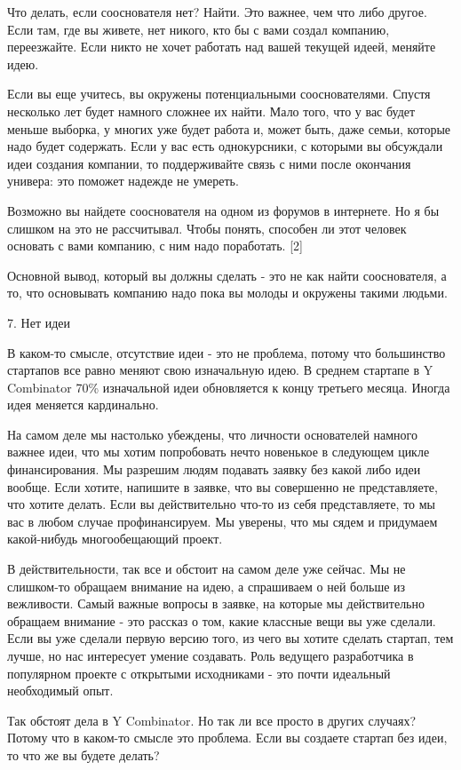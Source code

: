 \documentclass[ebook,12pt,oneside,openany]{memoir}
\begin{document}
Что делать, если сооснователя нет? Найти. Это важнее, чем что либо
другое. Если там, где вы живете, нет никого, кто бы с вами создал
компанию, переезжайте. Если никто не хочет работать над вашей текущей
идеей, меняйте идею.

Если вы еще учитесь, вы окружены потенциальными сооснователями. Спустя
несколько лет будет намного сложнее их найти. Мало того, что у вас
будет меньше выборка, у многих уже будет работа и, может быть, даже
семьи, которые надо будет содержать. Если у вас есть однокурсники, с
которыми вы обсуждали идеи создания компании, то поддерживайте связь с
ними после окончания универа: это поможет надежде не умереть.

Возможно вы найдете сооснователя на одном из форумов в интернете. Но я
бы слишком на это не рассчитывал. Чтобы понять, способен ли этот
человек основать с вами компанию, с ним надо поработать. [2]

Основной вывод, который вы должны сделать - это не как найти
сооснователя, а то, что основывать компанию надо пока вы молоды и
окружены такими людьми.

7. Нет идеи

В каком-то смысле, отсутствие идеи - это не проблема, потому что
большинство стартапов все равно меняют свою изначальную идею. В
среднем стартапе в Y Combinator 70\% изначальной идеи обновляется к
концу третьего месяца. Иногда идея меняется кардинально.

На самом деле мы настолько убеждены, что личности основателей намного
важнее идеи, что мы хотим попробовать нечто новенькое в следующем
цикле финансирования. Мы разрешим людям подавать заявку без какой либо
идеи вообще. Если хотите, напишите в заявке, что вы совершенно не
представляете, что хотите делать. Если вы действительно что-то из себя
представляете, то мы вас в любом случае профинансируем. Мы уверены,
что мы сядем и придумаем какой-нибудь многообещающий проект.

В действительности, так все и обстоит на самом деле уже сейчас. Мы не
слишком-то обращаем внимание на идею, а спрашиваем о ней больше из
вежливости. Самый важные вопросы в заявке, на которые мы действительно
обращаем внимание - это рассказ о том, какие классные вещи вы уже
сделали. Если вы уже сделали первую версию того, из чего вы хотите
сделать стартап, тем лучше, но нас интересует умение создавать. Роль
ведущего разработчика в популярном проекте с открытыми исходниками -
это почти идеальный необходимый опыт.

Так обстоят дела в Y Combinator. Но так ли все просто в других
случаях? Потому что в каком-то смысле это проблема. Если вы создаете
стартап без идеи, то что же вы будете делать?
\end{document}
